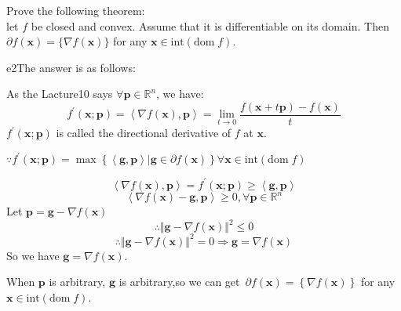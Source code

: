 \documentclass{article}
\newcommand{\xB}{\bm{x}}
\newcommand{\domf}{\textrm{dom}\;f}
\begin{document}
\begin{excercise}\label{e2}
Prove the following theorem: \\
let $f$ be closed and convex. Assume that it is differentiable on its domain. Then 
$\partial f(\xB) = \{ \nabla  f(\xB) \}$
for any $\xB \in \textrm{int}(\domf)$.
\end{excercise}

\begin{PROOF}{e2}The answer is as follows:

	As the Lacture10 says $\forall \bm{p} \in \mathbb{R} ^n$, we have:
	\begin{equation}
		f^{'}(\bm{x};\bm{p}) = \left\langle \nabla f(\xB),\bm{p}\right\rangle = \lim_{t\rightarrow 0} \frac{f(\xB+t\bm{p})-f(\xB)}{t}
	\end{equation}
	$f^{'}(\bm{x};\bm{p})$ is called the directional derivative of $f$ at $\xB$.

	$ \because f^{'}(\bm{x};\bm{p})=\max\left\{\left\langle\bm{g},\bm{p}\right\rangle|\bm{g}\in\partial f(\bm{x})\right\} \forall \bm{\xB}\in \textrm{int}(\domf)$
	
	\[
		\left\langle \nabla f(\xB),\bm{p}\right\rangle = f^{'}(\bm{x};\bm{p}) \ge \left\langle\bm{g},\bm{p}\right\rangle
	\]
	\[
	\left\langle\nabla f(\bm{x})-\bm{g},\bm{p}\right\rangle\ge 0,\forall \bm{p}\in\mathbb{R}^n
	\]
	Let $\bm{p}=\bm{g}-\nabla f(\bm{x})$
	\begin{equation}
		\therefore \Vert\bm{g}-\nabla f(\bm{x})\Vert^2\le 0 
	\end{equation}
	\[
		\therefore \Vert\bm{g}-\nabla f(\bm{x})\Vert^2 = 0 \Rightarrow \bm{g}=\nabla f(\bm{x})	
	\]
	So we have $\bm{g}=\nabla f(\bm{x})$.

	When $\bm{p}$ is arbitrary, $\bm{g}$ is arbitrary,so we can get\ $\partial f(\bm{x})=\left\{\nabla f(\bm{x})\right\}$ for any $\xB \in \textrm{int}(\domf)$.

\end{PROOF}
\end{document}
